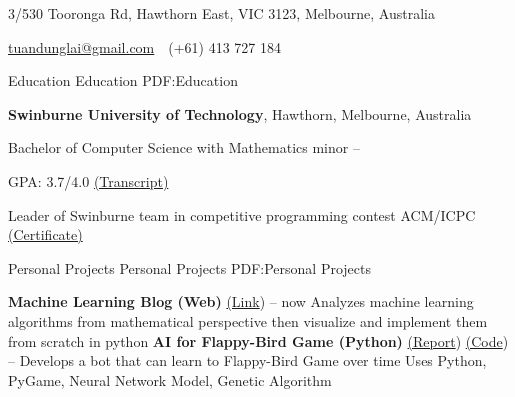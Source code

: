 \documentclass[letterpaper,MMMyyyy,nonstopmode]{simpleresumecv}
\newcommand{\CVAuthor}{Tuan Dung Lai}
\newcommand{\CVWebpage}{dunglai.github.io}
\begin{document}

\Title{\CVAuthor}

\begin{SubTitle}
{3/530 Tooronga Rd, Hawthorn East, VIC 3123, Melbourne, Australia}
\par
\href{mailto:tuandunglai@gmail.com}
{tuandunglai@gmail.com}
\,\SubBulletSymbol\,
(+61) 413 727 184
\,
\end{SubTitle}

\begin{Body}


\Section
{Education}
{Education}
{PDF:Education}

\Entry
{\textbf{Swinburne University of Technology}},
Hawthorn, Melbourne, Australia

\Gap
\BulletItem
Bachelor of Computer Science with Mathematics minor
\hfill
{} --

\SubBulletItem GPA: 3.7/4.0 
\href{https://dunglai.github.io/public/post-assets/About/AcademicTranscript.pdf}{(\color{blue}Transcript)}

\SubBulletItem Leader of Swinburne team in competitive programming contest ACM/ICPC \href{https://dunglai.github.io/public/post-assets/About/CVLatex/ACMcert.png}{(\color{blue}Certificate)}



\Section
{Personal Projects}
{Personal Projects}
{PDF:Personal Projects}

\BulletItem
\textbf{Machine Learning Blog (Web)} \href{https://dunglai.github.io}{(\color{blue}Link})
\hfill
{} --
now
\SubBulletItem Analyzes machine learning algorithms from mathematical perspective then visualize and implement them from scratch in python
\Gap\Gap\Gap
\BulletItem
\textbf{AI for Flappy-Bird Game (Python)} \href{https://dunglai.github.io/public/post-assets/FlappyBirdAI/report.pdf}{(\color{blue}Report}) \href{https://github.com/DungLai/AI-FlappyBird}{(\color{blue}Code})
\hfill
{} --
\SubBulletItem Develops a bot that can learn to Flappy-Bird Game over time
\SubBulletItem Uses Python, PyGame, Neural Network Model, Genetic Algorithm


\end{Body}
\end{document}

